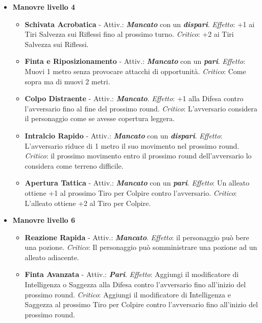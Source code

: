 \begin{multicols}{2}
\begin{itemize}[leftmargin=*]
	\item \textbf{Manovre livello 4}
	\begin{itemize}[leftmargin=*]
		\setlength{\itemsep}{0pt}
		\item \textbf{Schivata Acrobatica} - Attiv.: \textbf{\emph{Mancato}} con un \textbf{\emph{dispari}}. \emph{Effetto}: +1 ai Tiri Salvezza sui Riflessi fino al prossimo turno. \emph{Critico}: +2 ai Tiri Salvezza sui Riflessi.
		
		\item \textbf{Finta e Riposizionamento} - Attiv.: \textbf{\emph{Mancato}} con un \textbf{\emph{pari}}. \emph{Effetto}: Muovi 1 metro senza provocare attacchi di opportunità. \emph{Critico}: Come sopra ma di muovi 2 metri.
		
		\item \textbf{Colpo Distraente} - Attiv.: \textbf{\emph{Mancato}}. \emph{Effetto}: +1 alla Difesa contro l'avversario fino al fine del prossimo round. \emph{Critico}: L'avversario considera il personaggio come se avesse copertura leggera.
		
		\item \textbf{Intralcio Rapido} - Attiv.: \textbf{\emph{Mancato}} con un \textbf{\emph{dispari}}. \emph{Effetto}: L'avversario riduce di 1 metro il suo movimento nel prossimo round. \emph{Critico}: il prossimo movimento entro il prossimo round dell'avversario lo considera come terreno difficile.
		
		\item \textbf{Apertura Tattica} - Attiv.: \textbf{\emph{Mancato}} con un \textbf{\emph{pari}}. \emph{Effetto}: Un alleato ottiene +1 al prossimo Tiro per Colpire contro l'avversario. \emph{Critico}: L'alleato ottiene +2 al Tiro per Colpire.
	\end{itemize}
	
	\item \textbf{Manovre livello 6}
	\begin{itemize}[leftmargin=*]
		\setlength{\itemsep}{0pt}
		\item \textbf{Reazione Rapida} - Attiv.: \textbf{\emph{Mancato}}. \emph{Effetto}: il personaggio può bere una pozione. \emph{Critico}: Il personaggio può somministrare una pozione ad un alleato adiacente.
		
		\item \textbf{Finta Avanzata} - Attiv.: \textbf{\emph{Pari}}. \emph{Effetto}: Aggiungi il modificatore di Intelligenza o Saggezza alla Difesa contro l'avversario fino all'inizio del prossimo round. \emph{Critico}: Aggiungi il modificatore di Intelligenza e Saggezza al prossimo Tiro per Colpire contro l'avversario fino all'inizio del prossimo round.
		

\end{itemize}
\end{itemize}
\end{multicols}
